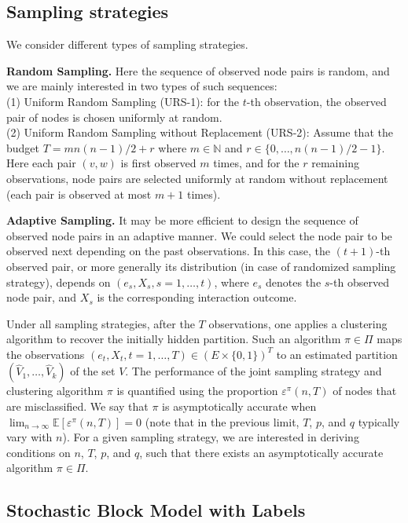 \documentclass[12pt]{colt}%
\begin{document}
\subsection{Sampling strategies}

We consider different types of sampling strategies.

\noindent
{\bf Random Sampling.} Here the sequence of observed node pairs is random, and we are mainly interested in two types of such sequences:\\
(1) Uniform Random Sampling (URS-1): for the $t$-th observation, the observed pair of nodes is chosen uniformly at random. \\
(2) Uniform Random Sampling without Replacement (URS-2): Assume that the budget $T=mn(n-1)/2+r$ where $m\in \mathbb{N}$ and $r\in\{0,\ldots,n(n-1)/2-1\}$. Here each pair $(v,w)$ is first observed $m$ times, and for the $r$ remaining observations, node pairs are selected uniformly at random without replacement (each pair is observed at most $m+1$ times). 

\noindent
{\bf Adaptive Sampling.} It may be more efficient to design the sequence of observed node pairs in an adaptive manner. We could select the node pair to be observed next depending on the past observations. In this case, the $(t+1)$-th observed pair, or more generally its distribution (in case of randomized sampling strategy), depends on $(e_s,X_s, s=1,\ldots, t)$, where $e_s$ denotes the $s$-th observed node pair, and $X_s$ is the corresponding interaction outcome. 

Under all sampling strategies, after the $T$ observations, one applies a clustering algorithm to recover the initially hidden partition. Such an algorithm $\pi\in \Pi$ maps the observations $(e_t,X_t, t=1,\ldots, T)\in (E\times \{0,1\})^T$ to an estimated partition $(\hat{V}_1,\ldots,\hat{V}_k)$ of the set $V$. The performance of the joint sampling strategy and clustering algorithm $\pi$ is quantified using the proportion $\varepsilon^\pi(n,T)$ of nodes that are misclassified. We say that $\pi$ is asymptotically accurate when $\lim_{n\to\infty} \mathbb{E}[\varepsilon^\pi(n,T)]=0$ (note that in the previous limit, $T$, $p$, and $q$ typically vary with $n$). For a given sampling strategy, we are interested in deriving conditions on $n$, $T$, $p$, and $q$, such that there exists an asymptotically accurate algorithm $\pi\in \Pi$. 


\subsection{Stochastic Block Model with Labels}
\end{document}
